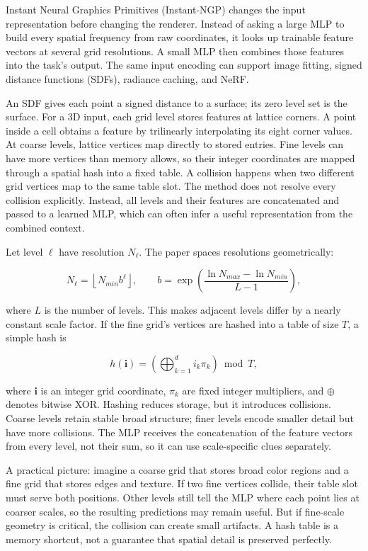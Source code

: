 Instant Neural Graphics Primitives (Instant-NGP) changes the input representation before changing the renderer. Instead of asking a large MLP to build every spatial frequency from raw coordinates, it looks up trainable feature vectors at several grid resolutions. A small MLP then combines those features into the task's output. The same input encoding can support image fitting, signed distance functions (SDFs), radiance caching, and NeRF.

An SDF gives each point a signed distance to a surface; its zero level set is the surface. For a 3D input, each grid level stores features at lattice corners. A point inside a cell obtains a feature by trilinearly interpolating its eight corner values. At coarse levels, lattice vertices map directly to stored entries. Fine levels can have more vertices than memory allows, so their integer coordinates are mapped through a spatial hash into a fixed table. A collision happens when two different grid vertices map to the same table slot. The method does not resolve every collision explicitly. Instead, all levels and their features are concatenated and passed to a learned MLP, which can often infer a useful representation from the combined context.

Let level \(\ell\) have resolution \(N_\ell\). The paper spaces resolutions geometrically:

\[N_\ell=\left\lfloor N_{min}b^\ell\right\rfloor,\qquad b=\exp\left(\frac{\ln N_{max}-\ln N_{min}}{L-1}\right),\]

where \(L\) is the number of levels. This makes adjacent levels differ by a nearly constant scale factor. If the fine grid's vertices are hashed into a table of size \(T\), a simple hash is

\[h(\mathbf{i})=\left(\bigoplus_{k=1}^{d}i_k\pi_k\right)\bmod T,\]

where \(\mathbf{i}\) is an integer grid coordinate, \(\pi_k\) are fixed integer multipliers, and \(\oplus\) denotes bitwise XOR. Hashing reduces storage, but it introduces collisions. Coarse levels retain stable broad structure; finer levels encode smaller detail but have more collisions. The MLP receives the concatenation of the feature vectors from every level, not their sum, so it can use scale-specific clues separately.

A practical picture: imagine a coarse grid that stores broad color regions and a fine grid that stores edges and texture. If two fine vertices collide, their table slot must serve both positions. Other levels still tell the MLP where each point lies at coarser scales, so the resulting predictions may remain useful. But if fine-scale geometry is critical, the collision can create small artifacts. A hash table is a memory shortcut, not a guarantee that spatial detail is preserved perfectly.

